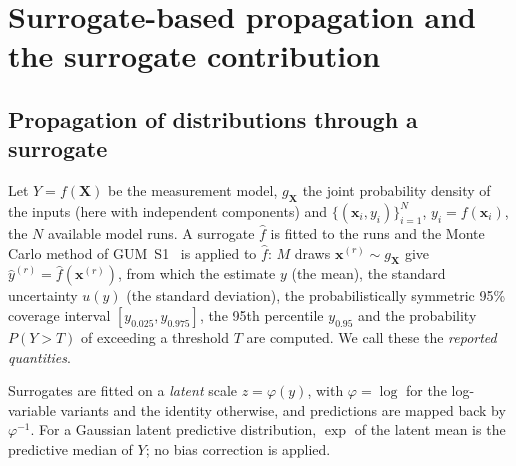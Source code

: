 
\section{Surrogate-based propagation and the surrogate contribution}
\label{sec:framework}
\subsection{Propagation of distributions through a surrogate}
Let $Y=f(\mathbf X)$ be the measurement model, $g_{\mathbf X}$ the joint
probability density of the inputs (here with independent components) and
$\{(\mathbf x_i,y_i)\}_{i=1}^N$, $y_i=f(\mathbf x_i)$, the $N$ available
model runs. A surrogate $\hat f$ is fitted to the runs and the Monte Carlo
method of GUM~S1~\cite{jcgm101} is applied to $\hat f$: $M$ draws
$\mathbf x^{(r)}\sim g_{\mathbf X}$ give $\hat y^{(r)}=\hat f(\mathbf x^{(r)})$,
from which the estimate $y$ (the mean), the standard uncertainty $u(y)$ (the
standard deviation), the probabilistically symmetric 95\% coverage interval
$[y_{0.025},y_{0.975}]$, the 95th percentile $y_{0.95}$ and the probability
$P(Y>T)$ of exceeding a threshold $T$ are computed. We call these the
\emph{reported quantities}.

Surrogates are fitted on a \emph{latent} scale $z=\varphi(y)$, with
$\varphi=\log$ for the log-variable variants and the identity otherwise, and
predictions are mapped back by $\varphi^{-1}$. For a Gaussian latent
predictive distribution, $\exp$ of the latent mean is the predictive median
of $Y$; no bias correction is applied.


